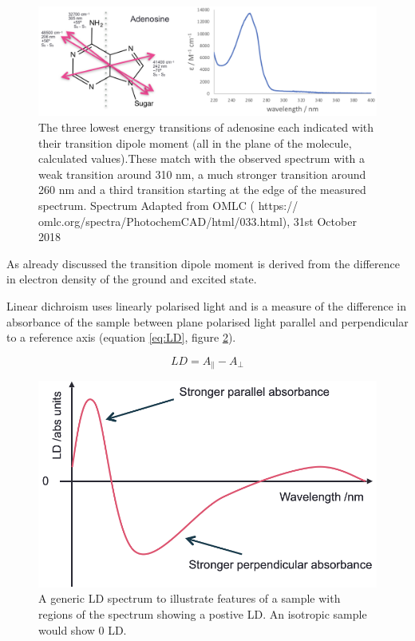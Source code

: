 \documentclass[
]{book}
\begin{document}
\begin{figure}

{\centering \includegraphics[width=1\linewidth]{images/adenosine} 

}

\caption{The three lowest energy transitions of adenosine each indicated with their transition dipole moment (all in the plane of the molecule, calculated values).These match with the observed spectrum with a weak transition around 310 nm, a much stronger transition around 260 nm and a third transition starting at the edge of the measured spectrum. Spectrum Adapted from OMLC ( https:// omlc.org/spectra/PhotochemCAD/html/033.html), 31st October 2018}\label{fig:adenosine}
\end{figure}

As already discussed the transition dipole moment is derived from the difference in electron density of the ground and excited state.

Linear dichroism uses linearly polarised light and is a measure of the difference in absorbance of the sample between plane polarised light parallel and perpendicular to a reference axis (equation \eqref{eq:LD}, figure \ref{fig:LD}).

\begin{equation}
LD = A_{\parallel} - A_{\perp}
\label{eq:LD}
\end{equation}

\begin{figure}

{\centering \includegraphics[width=0.6\linewidth]{images/LD} 

}

\caption{A generic LD spectrum to illustrate features of a sample with regions of the spectrum showing a postive LD. An isotropic sample would show 0 LD.}\label{fig:LD}
\end{figure}
\end{document}
